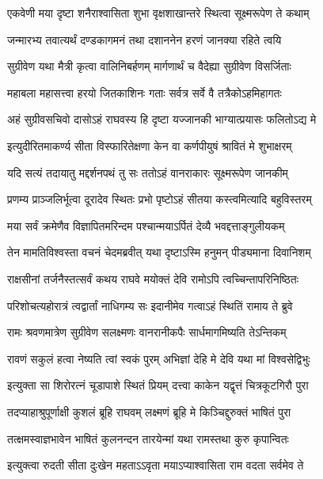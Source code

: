 \twolineshloka
{एकवेणी मया दृष्टा शनैराश्वासिता शुभा}
{वृक्षशाखान्तरे स्थित्वा सूक्ष्मरूपेण ते कथाम्} %

\twolineshloka
{जन्मारभ्य तवात्यर्थं दण्डकागमनं तथा}
{दशाननेन हरणं जानक्या रहिते त्वयि} %

\twolineshloka
{सुग्रीवेण यथा मैत्री कृत्वा वालिनिबर्हणम्}
{मार्गणार्थं च वैदेह्या सुग्रीवेण विसर्जिताः} %

\twolineshloka
{महाबला महासत्त्वा हरयो जितकाशिनः}
{गताः सर्वत्र सर्वे वै तत्रैकोऽहमिहागतः} %

\twolineshloka
{अहं सुग्रीवसचिवो दासोऽहं राघवस्य हि}
{दृष्टा यज्जानकी भाग्यात्प्रयासः फलितोऽद्य मे} %

\twolineshloka
{इत्युदीरितमाकर्ण्य सीता विस्फारितेक्षणा}
{केन वा कर्णपीयुषं श्रावितं मे शुभाक्षरम्} %

\twolineshloka
{यदि सत्यं तदायातु मद्दर्शनपथं तु सः}
{ततोऽहं वानराकारः सूक्ष्मरूपेण जानकीम्} %

\twolineshloka
{प्रणम्य प्राञ्जलिर्भूत्वा दूरादेव स्थितः प्रभो}
{पृष्टोऽहं सीतया कस्त्वमित्यादि बहुविस्तरम्} %

\twolineshloka
{मया सर्वं क्रमेणैव विज्ञापितमरिन्दम}
{पश्चान्मयाऽर्पितं देव्यै भवद्दत्ताङ्गुलीयकम्} %

\twolineshloka
{तेन मामतिविश्वस्ता वचनं चेदमब्रवीत्}
{यथा दृष्टाऽस्मि हनुमन् पीड्यमाना दिवानिशम्} %

\twolineshloka
{राक्षसीनां तर्जनैस्तत्सर्वं कथय राघवे}
{मयोक्तं देवि रामोऽपि त्वच्चिन्तापरिनिष्ठितः} %

\twolineshloka
{परिशोचत्यहोरात्रं त्वद्वार्तां नाधिगम्य सः}
{इदानीमेव गत्वाऽहं स्थितिं रामाय ते ब्रुवे} %

\twolineshloka
{रामः श्रवणमात्रेण सुग्रीवेण सलक्ष्मणः}
{वानरानीकपैः सार्धमागमिष्यति तेऽन्तिकम्} %

\twolineshloka
{रावणं सकुलं हत्वा नेष्यति त्वां स्वकं पुरम्}
{अभिज्ञां देहि मे देवि यथा मां विश्वसेद्विभुः} %

\twolineshloka
{इत्युक्ता सा शिरोरत्नं चूडापाशे स्थितं प्रियम्}
{दत्त्वा काकेन यद्वृत्तं चित्रकूटगिरौ पुरा} %

\twolineshloka
{तदप्याहाश्रुपूर्णाक्षी कुशलं ब्रूहि राघवम्}
{लक्ष्मणं ब्रूहि मे किञ्चिद्दुरुक्तं भाषितं पुरा} %

\twolineshloka
{तत्क्षमस्वाज्ञभावेन भाषितं कुलनन्दन}
{तारयेन्मां यथा रामस्तथा कुरु कृपान्वितः} %

\twolineshloka
{इत्युक्त्वा रुदती सीता दुःखेन महताऽऽवृता}
{मयाऽप्याश्वासिता राम वदता सर्वमेव ते} %

